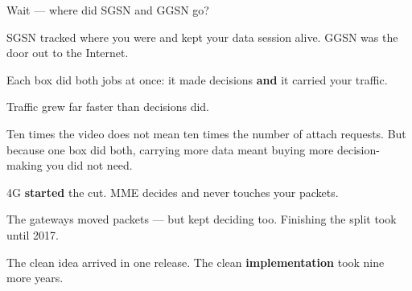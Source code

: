 %
\begin{frame}{Wait --- where did SGSN and GGSN go?}
  \gonebox
    {SGSN tracked where you were and kept your data session alive.
     GGSN was the door out to the Internet.

     \vspace{0.4em}
     Each box did both jobs at once: it made decisions \textbf{and} it
     carried your traffic.}
    {Traffic grew far faster than decisions did.

     \vspace{0.4em}
     Ten times the video does not mean ten times the number of
     attach requests. But because one box did both, carrying more
     data meant buying more decision-making you did not need.}
    {4G \textbf{started} the cut. MME decides and never touches your packets.

     \vspace{0.4em}
     The gateways moved packets --- but kept deciding too. Finishing the
     split took until 2017.}

  \vspace{0.5em}
  {\small The clean idea arrived in one release. The clean \textbf{implementation}
   took nine more years.\par}

  \vspace{0.3em}
\end{frame}

